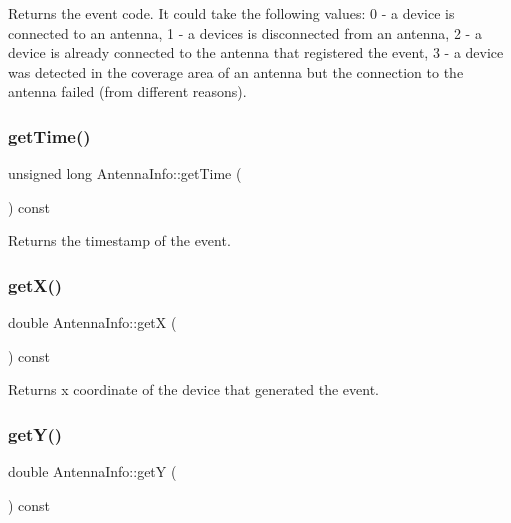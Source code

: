 \begin{DoxyReturn}{Returns}
the event code. It could take the following values\+: 0 -\/ a device is connected to an antenna, 1 -\/ a devices is disconnected from an antenna, 2 -\/ a device is already connected to the antenna that registered the event, 3 -\/ a device was detected in the coverage area of an antenna but the connection to the antenna failed (from different reasons). 
\end{DoxyReturn}
\mbox{\label{class_antenna_info_aaae1e1105ba4a724c0061e3f7904b1e5}} 
\subsubsection{\texorpdfstring{getTime()}{getTime()}}
{\footnotesize\ttfamily unsigned long Antenna\+Info\+::get\+Time (\begin{DoxyParamCaption}{ }\end{DoxyParamCaption}) const}

\begin{DoxyReturn}{Returns}
the timestamp of the event. 
\end{DoxyReturn}
\mbox{\label{class_antenna_info_a3817cba0231888dc5977105ace0faddb}} 
\subsubsection{\texorpdfstring{getX()}{getX()}}
{\footnotesize\ttfamily double Antenna\+Info\+::getX (\begin{DoxyParamCaption}{ }\end{DoxyParamCaption}) const}

\begin{DoxyReturn}{Returns}
x coordinate of the device that generated the event. 
\end{DoxyReturn}
\mbox{\label{class_antenna_info_aa385e3e85d783b81d69014a64b5fc94f}} 
\subsubsection{\texorpdfstring{getY()}{getY()}}
{\footnotesize\ttfamily double Antenna\+Info\+::getY (\begin{DoxyParamCaption}{ }\end{DoxyParamCaption}) const}

